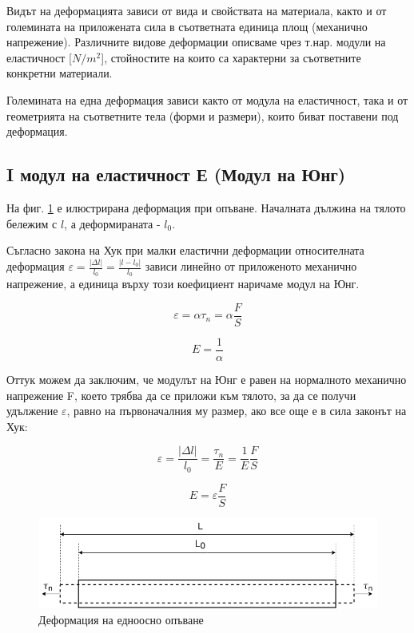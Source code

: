 \documentclass[12pt]{article}
\begin{document}
Видът на деформацията зависи от вида и свойствата на материала, както и от големината на приложената сила в съответната единица площ (механично напрежение). Различните видове деформации описваме чрез т.нар. модули на еластичност [$N/m^2$], стойностите на които са характерни за съответните конкретни материали.

Големината на една деформация зависи както от модула на еластичност, така и от геометрията на съответните тела (форми и размери), които биват поставени под деформация.

\subsection{I модул на еластичност Е (Модул на Юнг)}
На фиг. \ref{fig:stretching} е илюстрирана деформация при опъване. Началната дължина на тялото бележим с $l$, а деформираната - $l_0$. 

Съгласно закона на Хук при малки еластични деформации относителната деформация $\varepsilon = \frac{|\Delta l|}{l_0} = \frac{|l - l_0|}{l_0}$ зависи линейно от приложеното механично напрежение, а единица върху този коефициент наричаме модул на Юнг.

\begin{equation}
    \varepsilon = \alpha \tau_n = \alpha \frac{F}{S}
\end{equation}

\begin{equation}
    E = \frac{1}{\alpha}
\end{equation}

Оттук можем да заключим, че модулът на Юнг е равен на нормалното механично напрежение F, което трябва да се приложи към тялото, за да се получи удължение $\varepsilon$, равно на първоначалния му размер, ако все още е в сила законът на Хук:

\begin{equation}
    \varepsilon = \frac{|\Delta l|}{l_0} = \frac{\tau_n}{E} = \frac{1}{E} \frac{F}{S}
\end{equation}

\begin{equation}
    E = \varepsilon \frac{F}{S}
\end{equation}


\begin{figure}
    \centering
    \includegraphics[width=1\textwidth]{images/young.drawio.png}
    \caption{Деформация на едноосно опъване}
    \label{fig:stretching}
\end{figure}
\end{document}
